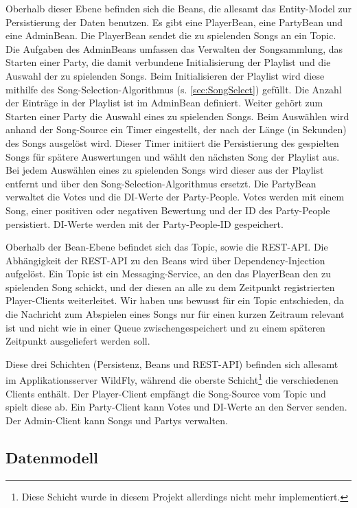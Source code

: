 Oberhalb dieser Ebene befinden sich die Beans, die allesamt das Entity-Model zur Persistierung der Daten benutzen. Es gibt eine PlayerBean, eine PartyBean und eine AdminBean.
Die PlayerBean sendet die zu spielenden Songs an ein Topic.
Die Aufgaben des AdminBeans umfassen das Verwalten der Songsammlung, das Starten einer Party, die damit verbundene Initialisierung der Playlist und die Auswahl der zu spielenden Songs. Beim Initialisieren der Playlist wird diese mithilfe des Song-Selection-Algorithmus (s. \ref{sec:SongSelect}) gefüllt. Die Anzahl der Einträge in der Playlist ist im AdminBean definiert. Weiter gehört zum Starten einer Party die Auswahl eines zu spielenden Songs. Beim Auswählen wird anhand der Song-Source ein Timer eingestellt, der nach der Länge (in Sekunden) des Songs ausgelöst wird. Dieser Timer initiiert die Persistierung des gespielten Songs für spätere Auswertungen und wählt den nächsten Song der Playlist aus. Bei jedem Auswählen eines zu spielenden Songs wird dieser aus der Playlist entfernt und über den Song-Selection-Algorithmus ersetzt.
Die PartyBean verwaltet die Votes und die DI-Werte der Party-People. Votes werden mit einem Song, einer positiven oder negativen Bewertung und der ID des Party-People persistiert. DI-Werte werden mit der Party-People-ID gespeichert.

Oberhalb der Bean-Ebene befindet sich das Topic, sowie die REST-API. Die Abhängigkeit der REST-API zu den Beans wird über Dependency-Injection aufgelöst. Ein Topic ist ein Messaging-Service, an den das PlayerBean den zu spielenden Song schickt, und der diesen an alle zu dem Zeitpunkt registrierten Player-Clients weiterleitet. Wir haben uns bewusst für ein Topic entschieden, da die Nachricht zum Abspielen eines Songs nur für einen kurzen Zeitraum relevant ist und nicht wie in einer Queue zwischengespeichert und zu einem späteren Zeitpunkt ausgeliefert werden soll.

Diese drei Schichten (Persistenz, Beans und REST-API) befinden sich allesamt im Applikationsserver WildFly, während die oberste Schicht\footnote{Diese Schicht wurde in diesem Projekt allerdings nicht mehr implementiert.} die verschiedenen Clients enthält. Der Player-Client empfängt die Song-Source vom Topic und spielt diese ab. Ein Party-Client kann Votes und DI-Werte an den Server senden. Der Admin-Client kann Songs und Partys verwalten.
\newpage

\subsection{Datenmodell}

